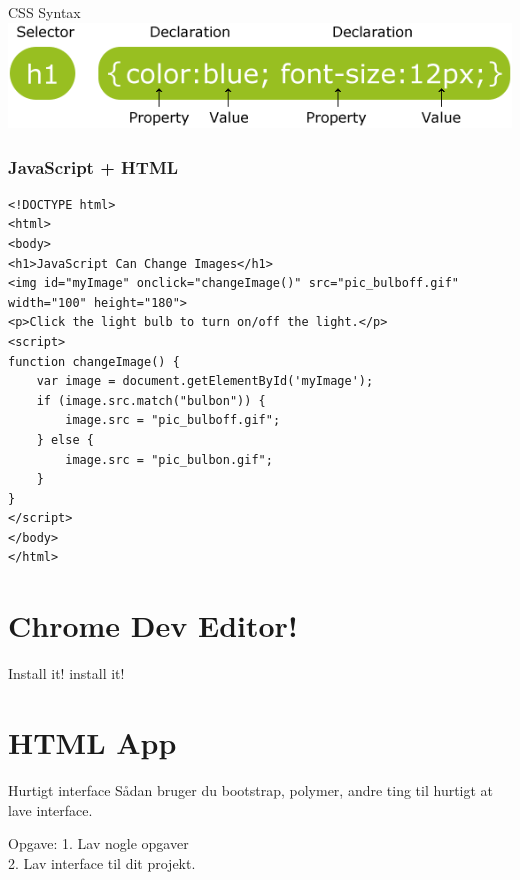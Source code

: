 \documentclass[10pt]{beamer}
\begin{document}
\begin{frame}{CSS Syntax}
		\includegraphics[width=\linewidth]{img/css-syntax.png}
\end{frame}

\begin{frame}[fragile]
 \frametitle{JavaScript + HTML}
\begin{lstlisting}
<!DOCTYPE html>
<html>
<body>
<h1>JavaScript Can Change Images</h1>
<img id="myImage" onclick="changeImage()" src="pic_bulboff.gif" width="100" height="180">
<p>Click the light bulb to turn on/off the light.</p>
<script>
function changeImage() {
    var image = document.getElementById('myImage');
    if (image.src.match("bulbon")) {
        image.src = "pic_bulboff.gif";
    } else {
        image.src = "pic_bulbon.gif";
    }
}
</script>
</body>
</html>
\end{lstlisting}
\end{frame}



\section{Chrome Dev Editor!}
\begin{frame}{Install it!}
	install it!
\end{frame}


\section{HTML App}
\begin{frame}{Hurtigt interface}
	Sådan bruger du bootstrap, polymer, andre ting til hurtigt at lave interface.
\end{frame}

\begin{frame}{Opgave:}
	1. Lav nogle opgaver \\
	2. Lav interface til dit projekt.
\end{frame}
\end{document}

